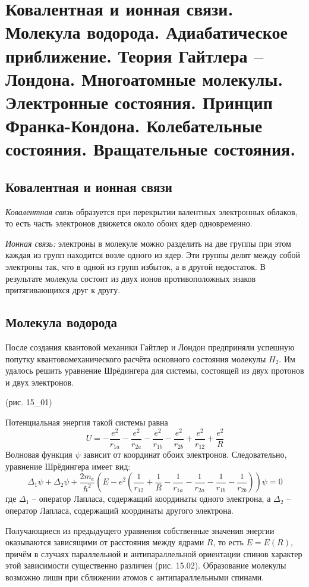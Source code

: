 \chapter{Ковалентная и ионная связи. Молекула водорода. Адиабатическое 
приближение. Теория Гайтлера -- Лондона. Многоатомные молекулы. 
Электронные состояния. Принцип Франка-Кондона. Колебательные состояния. 
Вращательные состояния.}

\section{Ковалентная и ионная связи}
\emph{Ковалентная связь} образуется при перекрытии валентных электронных 
облаков, то есть часть электронов движется около обоих ядер одновременно.

\emph{Ионная связь:} электроны в молекуле можно разделить на две группы 
при этом каждая из групп находится возле одного из ядер. Эти группы делят 
между собой электроны так, что в одной из групп избыток, а в другой 
недостаток. В результате молекула состоит из двух ионов противоположных 
знаков притягивающихся друг к другу.

\section{Молекула водорода}
После создания квантовой механики Гайтлер и Лондон предприняли успешную 
попутку квантовомеханического расчёта основного состояния молекулы 
\( H_2 \). Им удалось решить уравнение Шрёдингера для системы, состоящей 
из двух протонов и двух электронов.

(рис. 15\_01)

Потенциальная энергия такой системы равна
\[ 
	U = -\frac{e^2}{r_{1a}} - \frac{e^2}{r_{2a}} - \frac{e^2}{r_{1b}} -
	\frac{e^2}{r_{2b}} + \frac{e^2}{r_{12}} + \frac{e^2}{R} 
\]
Волновая функция \( \psi \) зависит от координат обоих электронов. 
Следовательно, уравнение Шрёдингера имеет вид:
\[ 
	\Delta_1\psi + \Delta_2\psi + \frac{2m_e}{\hbar^2}
	\left(E - e^2\left( \frac{1}{r_{12}} + \frac{1}{R} -
	\frac{1}{r_{1a}} - \frac{1}{r_{2a}} - \frac{1}{r_{1b}} -
	\frac{1}{r_{2b}}\right) \right)\psi = 0
\]
где \( \Delta_1 \) -- оператор Лапласа, содержащий координаты 
одного электрона, а \( \Delta_2 \) -- оператор Лапласа, содержащий 
координаты другого электрона.

Получающиеся из предыдущего уравнения собственные значения 
энергии оказываются зависящими от расстояния между ядрами \( R \), 
то есть \( E = E(R) \), причём в случаях параллельной и 
антипараллельной ориентации спинов характер этой зависимости существенно 
различен (рис. 15.02). Образование молекулы возможно лиши при сближении 
атомов с антипараллельными спинами.


